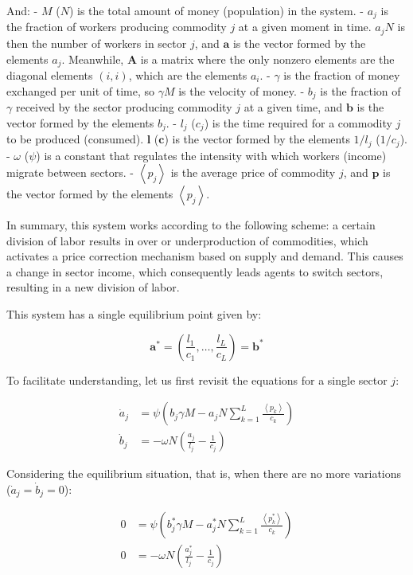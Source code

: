 And:  
- $M$ ($N$) is the total amount of money (population) in the system.  
- $a_{j}$ is the fraction of workers producing commodity $j$ at a given moment in time. $a_{j}N$ is then the number of workers in sector $j$, and $\boldsymbol{a}$ is the vector formed by the elements $a_{j}$. Meanwhile, $\boldsymbol{A}$ is a matrix where the only nonzero elements are the diagonal elements $(i,i)$, which are the elements $a_{i}$.  
- $\gamma$ is the fraction of money exchanged per unit of time, so $\gamma M$ is the velocity of money.  
- $b_{j}$ is the fraction of $\gamma$ received by the sector producing commodity $j$ at a given time, and $\boldsymbol{b}$ is the vector formed by the elements $b_{j}$.  
- $l_{j}$ ($c_{j}$) is the time required for a commodity $j$ to be produced (consumed). $\boldsymbol{l}$ ($\boldsymbol{c}$) is the vector formed by the elements $1/l_{j}$ ($1/c_{j}$).  
- $\omega$ ($\psi$) is a constant that regulates the intensity with which workers (income) migrate between sectors.  
- $\left\langle p_{j}\right\rangle$ is the average price of commodity $j$, and $\boldsymbol{p}$ is the vector formed by the elements $\left\langle p_{j}\right\rangle$.

In summary, this system works according to the following scheme: a certain division of labor results in over or underproduction of commodities, which activates a price correction mechanism based on supply and demand. This causes a change in sector income, which consequently leads agents to switch sectors, resulting in a new division of labor.  

This system has a single equilibrium point given by:


$$\boldsymbol{a}^{*}=\left(\frac{l_{1}}{c_{1}},\dots,\frac{l_{L}}{c_{L}}\right)=\boldsymbol{b}^{*}$$

To facilitate understanding, let us first revisit the equations for a single sector $j$:

\begin{align*}
\dot{a}_{j} & =\psi\left(b_{j}\gamma M-a_{j}N\sum_{k=1}^{L}\frac{\left\langle p_{k}\right\rangle }{c_{k}}\right)\\
\dot{b}_{j} & =-\omega N\left(\frac{a_{j}}{l_{j}}-\frac{1}{c_{j}}\right)
\end{align*}

Considering the equilibrium situation, that is, when there are no more variations ($\dot{a}_{j}=\dot{b}_{j}=0$):

\begin{align*}
0 & =\psi\left(b_{j}^{*}\gamma M-a_{j}^{*}N\sum_{k=1}^{L}\frac{\left\langle p_{k}^{*}\right\rangle }{c_{k}}\right)\\
0 & =-\omega N\left(\frac{a_{j}^{*}}{l_{j}}-\frac{1}{c_{j}}\right)
\end{align*}

